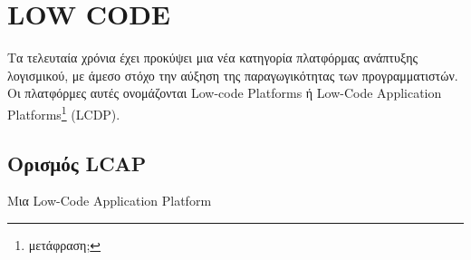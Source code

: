 \chapter{LOW CODE}
    Τα τελευταία χρόνια έχει προκύψει μια νέα κατηγορία πλατφόρμας ανάπτυξης λογισμικού, με άμεσο στόχο την αύξηση της παραγωγικότητας των προγραμματιστών.
    Οι πλατφόρμες αυτές ονομάζονται Low-code Platforms ή Low-Code Application Platforms\footnote{μετάφραση;} (LCDP). \cite{Bock2021}

    \section{Ορισμός LCAP}
        Μια Low-Code Application Platform